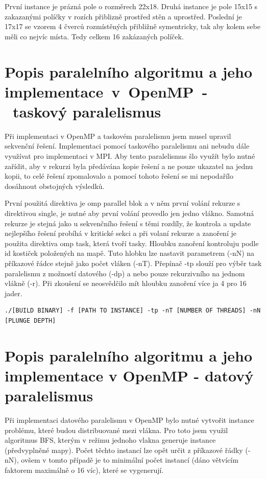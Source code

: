 \documentclass[]{article}
\begin{document}
První instance je prázná pole o rozměrech 22x18. Druhá instance je pole 15x15 s zakazanými políčky v rozích přiblizně prostřed stěn a uprostřed. Poslední je 17x17 se vzorem 4 čverců rozmístěných přibližně symentricky, tak aby kolem sebe měli co nejvíc místa. Tedy celkem 16 zakázaných políček.
\section{Popis paralelního algoritmu a jeho implementace~v~OpenMP~-~taskový paralelismus}
Při implementaci v OpenMP a taskovém paralelismu jsem musel upravil sekvenční řešení. Implementaci pomocí taskového paralelismu ani nebudu dále využívat pro implementaci v MPI. Aby tento paralelismus šlo využít bylo nutné zařídit, aby v rekurzi byla předávána kopie řešení a ne pouze ukazatel na jednu kopii, to celé řešení zpomalovalo a pomocí tohoto řešení se mi nepodařílo dosáhnout obstojných výsledků. 

První použitá direktiva je omp parallel blok a v něm první volání rekurze s direktivou single, je nutné aby první volání provedlo jen jedno vlákno. Samotná rekurze je stejná jako u sekvenčního řešení s těmi rozdíly, že kontrola a update nejlepšího řešení probíhá v kritické sekci a při volaní rekurze a zanoření je použita direktiva omp task, která tvoří tasky. Hloubku zanoření kontroluju podle id kostiček položených na mapě. Tuto hlobku lze nastavit parametrem (-nN) na příkazové řádce stejně jako počet vláken (-nT). Přepínač -tp slouží pro výběr task paralelismu z možností datového (-dp) a nebo pouze rekurzivního na jednom vlákně (-r). Při zkoušení se neosvědčilo mít hloubku zanoření více ja 4 pro 16 jader.

\begin{verbatim}
./[BUILD BINARY] -f [PATH TO INSTANCE] -tp -nT [NUMBER OF THREADS] -nN [PLUNGE DEPTH]
\end{verbatim}


\section{Popis paralelního algoritmu a jeho implementace v OpenMP - datový paralelismus}\label{kap1}

Při implementaci datového paralelismu v OpenMP bylo nutné vytvořit instance problému, které budou distribuované mezi vlákna. Pro toto jsem využil algoritmus BFS, kterým v režimu jednoho vlakna generuje instance (předvyplněné mapy). Počet těchto instancí lze opět určit z příkazové řádky (-nN), ovšem v tomto případě je to minimální počet instancí (dáno větvícím faktorem maximálně o 16 víc), které se vygenerují. 
\end{document}
